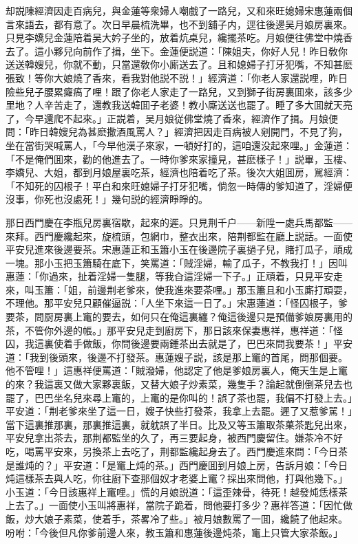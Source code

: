 却説陳經濟因走百病兒，與金蓮等衆婦人嘲戲了一路兒，又和來旺媳婦宋惠蓮兩個言來語去，都有意了。次日早晨梳洗畢，也不到舖子内，逕往後邊吴月娘房裏來。只見李嬌兒金蓮陪着吴大妗子坐的，放着炕桌兒，纔擺茶吃。月娘便往佛堂中燒香去了。這小夥兒向前作了揖，坐下。金蓮便説道：「陳姐夫，你好人兒！昨日敎你送送韓嫂兒，你就不動，只當還敎你小廝送去了。且和媳婦子打牙犯嘴，不知甚麽張致！等你大娘燒了香來，看我對他説不説！」經濟道：「你老人家還説哩，昨日險些兒子腰累㿚瘑了哩！跟了你老人家走了一路兒，又到獅子街房裏囬來，該多少里地？人辛苦走了，還教我送韓囬子老婆！教小廝送送也罷了。睡了多大囬就天亮了，今早還爬不起來。」正説着，吴月娘従佛堂燒了香來，經濟作了揖。月娘便問：「昨日韓嫂兒為甚麽撒酒風罵人？」經濟把因走百病被人剜開門，不見了狗，坐在當街哭喊罵人，「今早他漢子來家，一頓好打的，這咱還没起來哩。」金蓮道：「不是俺們囬來，勸的他進去了。一時你爹來家撞見，甚麽樣子！」説畢，玉樓、李嬌兒、大姐，都到月娘屋裏吃茶，經濟也陪着吃了茶。後次大姐囬房，駡經濟：「不知死的囚根子！平白和來旺媳婦子打牙犯嘴，倘忽一時傳的爹知道了，淫婦便沒事，你死也沒處死！」幾句説的經濟睜睜的。

那日西門慶在李瓶兒房裏宿歇，起來的遲。只見荆千户——新陞一處兵馬都監——來拜。西門慶纔起來，旋梳頭，包網巾，整衣出來，陪荆都監在廳上説話。一面使平安兒進來後邊要茶。宋惠蓮正和玉簫小玉在後邊院子裏撾子兒，賭打瓜子，頑成一塊。那小玉把玉簫騎在底下，笑罵道：「賊淫婦，輸了瓜子，不教我打！」因叫惠蓮：「你過來，扯着淫婦一隻腿，等我㒲這淫婦一下子。」正頑着，只見平安走來，叫玉簫：「姐，前邊荆老爹來，使我進來要茶哩。」那玉簫且和小玉廝打頑耍，不理他。那平安兒只顧催逼説：「人坐下來這一日了。」宋惠蓮道：「怪囚根子，爹要茶，問厨房裏上竃的要去，如何只在俺這裏纏？俺這後邊只是預備爹娘房裏用的茶，不管你外邊的帳。」那平安兒走到廚房下，那日該來保妻惠祥，惠祥道：「怪囚，我這裏使着手做飯，你問後邊要兩鍾茶出去就是了，巴巴來問我要茶！」平安道：「我到後頭來，後邊不打發茶。惠蓮嫂子説，該是那上竃的首尾，問那個要。他不管哩！」這惠祥便罵道：「賊潑婦，他認定了他是爹娘房裏人，俺天生是上竃的來？我這裏又做大家夥裏飯，又替大娘子炒素菜，幾隻手？論起就倒倒茶兒去也罷了，巴巴坐名兒來尋上竃的，上竃的是你叫的！誤了茶也罷，我偏不打發上去。」平安道：「荆老爹來坐了這一日，嫂子快些打發茶，我拿上去罷。遲了又惹爹駡！」當下這裏推那裏，那裏推這裏，就躭誤了半日。比及又等玉簫取茶菓茶匙兒出來，平安兒拿出茶去，那荆都監坐的久了，再三要起身，被西門慶留住。嫌茶冷不好吃，喝罵平安來，另換茶上去吃了，荆都監纔起身去了。西門慶進來問：「今日茶是誰炖的？」平安道：「是竃上炖的茶。」西門慶囬到月娘上房，告訴月娘：「今日炖這樣茶去與人吃，你往廚下查那個奴才老婆上竃？採出來問他，打與他幾下。」小玉道：「今日該惠祥上竃哩。」慌的月娘説道：「這歪辣骨，待死！越發炖恁樣茶上去了。」一面使小玉叫將惠祥，當院子跪着，問他要打多少？惠祥答道：「因忙做飯，炒大娘子素菜，使着手，茶畧冷了些。」被月娘數罵了一囬，纔饒了他起來。吩咐：「今後但凡你爹前邊人來，教玉簫和惠蓮後邊炖茶，竃上只管大家茶飯。」

